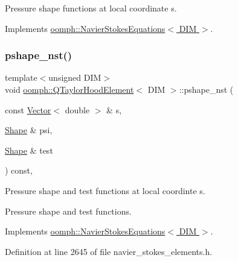 Pressure shape functions at local coordinate s. 



Implements \hyperlink{classoomph_1_1NavierStokesEquations_a487030303b71da299aed3d4639a022ab}{oomph\+::\+Navier\+Stokes\+Equations$<$ D\+I\+M $>$}.

\mbox{\label{classoomph_1_1QTaylorHoodElement_a63b1c65111efb6bea78245b897516c71}} 
\subsubsection{\texorpdfstring{pshape\+\_\+nst()}{pshape\_nst()}\hspace{0.1cm}{\footnotesize\ttfamily [2/4]}}
{\footnotesize\ttfamily template$<$unsigned D\+IM$>$ \\
void \hyperlink{classoomph_1_1QTaylorHoodElement}{oomph\+::\+Q\+Taylor\+Hood\+Element}$<$ D\+IM $>$\+::pshape\+\_\+nst (\begin{DoxyParamCaption}\item[{const \hyperlink{classoomph_1_1Vector}{Vector}$<$ double $>$ \&}]{s,  }\item[{\hyperlink{classoomph_1_1Shape}{Shape} \&}]{psi,  }\item[{\hyperlink{classoomph_1_1Shape}{Shape} \&}]{test }\end{DoxyParamCaption}) const\hspace{0.3cm}{\ttfamily [inline]}, {\ttfamily [virtual]}}



Pressure shape and test functions at local coordinte s. 

Pressure shape and test functions. 

Implements \hyperlink{classoomph_1_1NavierStokesEquations_a55f96a5c9f985476aeb145f683d63001}{oomph\+::\+Navier\+Stokes\+Equations$<$ D\+I\+M $>$}.



Definition at line 2645 of file navier\+\_\+stokes\+\_\+elements.\+h.

\mbox{\label{classoomph_1_1QTaylorHoodElement_a3638aa1e57ea83073b61f7b4bdd57c80}} 
